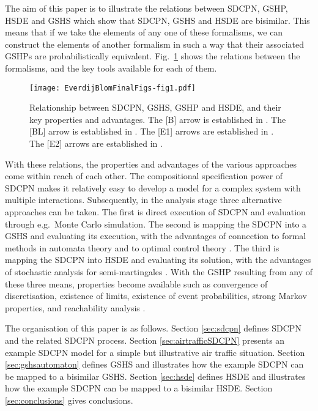 \documentclass[copyright,creativecommons]{eptcs}
\begin{document}
The aim of this paper is to illustrate the relations between
SDCPN, GSHP, HSDE and GSHS which show that SDCPN, GSHS and HSDE
are bisimilar. This means that if we take the elements of any one
of these formalisms, we can construct the elements of another
formalism in such a way that their associated GSHPs are
probabilistically equivalent. Fig.\ \ref{fig:GSHS:GSHP:SDCPN}
shows the relations between the formalisms, and the key tools
available for each of them.


\begin{figure}[h!bt]
\begin{center}
\texttt{[image: EverdijBlomFinalFigs-fig1.pdf]}
\end{center}
\caption{Relationship between SDCPN, GSHS, GSHP and HSDE, and
their key properties and advantages.
The [B] arrow is established in \protect\cite{Blom2003}.
The [BL] arrow is established in \protect\cite{BujorianuLygeros2006}.
The [E1] arrows are established in \protect\cite{EverdijBlom2006}.
The [E2] arrows are established in \protect\cite{EverdijBlom2009}.}
\label{fig:GSHS:GSHP:SDCPN}
\end{figure}


With these relations, the properties and advantages of the various
approaches come within reach of each other. The compositional
specification power of SDCPN makes it relatively easy to develop a
model for a complex system with multiple interactions.
Subsequently, in the analysis stage three alternative approaches
can be taken. The first is direct execution of SDCPN and
evaluation through e.g.\ Monte Carlo simulation. The second is
mapping the SDCPN into a GSHS and evaluating its execution, with
the advantages of connection to formal methods in automata theory
and to optimal control theory \cite{BujorianuLygeros2004cdc}. The
third is mapping the SDCPN into HSDE and evaluating its solution,
with the advantages of stochastic analysis for semi-martingales
\cite{Elliott1982,ElliottAggounMoore1995}. With the GSHP
resulting from any of these three means, properties become
available such as convergence of discretisation, existence of
limits, existence of event probabilities, strong Markov
properties, and reachability analysis
\cite{BujorianuLygeros2006,Davis1993,EthierKurtz1986}.

The organisation of this paper is as follows. Section
\ref{sec:sdcpn} defines SDCPN and the related SDCPN process.
Section \ref{sec:airtrafficSDCPN} presents an example SDCPN model
for a simple but illustrative air traffic situation. Section
\ref{sec:gshsautomaton} defines GSHS and illustrates how the
example SDCPN can be mapped to a bisimilar GSHS. Section
\ref{sec:hsde} defines HSDE and illustrates how the example SDCPN
can be mapped to a bisimilar HSDE. Section \ref{sec:conclusions}
gives conclusions.
\end{document}
